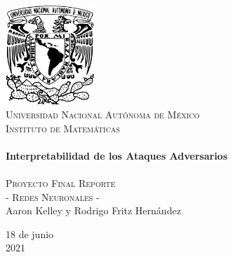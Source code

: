 \begin{titlepage}
    \begin{center}
    
    \includegraphics[width=0.25\textwidth]{resources/unam_escudo.png}~\\[0.1cm]
    \textsc{\Large Universidad Nacional Autónoma de México}\\[0.2cm]  
    \textsc{\Large Instituto de Matemáticas}\\[3cm]
    
    \HRule \\[0.5cm] 
    {\huge \bfseries Interpretabilidad de los Ataques Adversarios} \\[0.4cm] 
    \HRule \\[0.5cm]
    
    \textsc{\Large Proyecto Final Reporte}\\[0.4cm]
    \textsc{\Large - Redes Neuronales - }\\[2cm]
    
    
    \Large Aaron Kelley y Rodrigo Fritz Hernández
    \vfill
    
    {18 de junio \\ 2021}
    
    \end{center} 
    \end{titlepage}